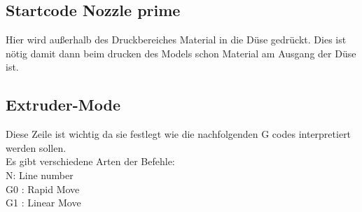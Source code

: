 \newpage

\subsection{Startcode Nozzle prime}

Hier wird außerhalb des Druckbereiches Material in die Düse gedrückt.
Dies ist nötig damit dann beim drucken des Models schon Material am Ausgang der Düse ist.

\subsection{Extruder-Mode}

Diese Zeile ist wichtig da sie festlegt wie die nachfolgenden G codes interpretiert werden sollen.\\

Es gibt verschiedene Arten der Befehle:\\

N: Line number\\
G0 : Rapid Move\\
G1 : Linear Move\\





%





